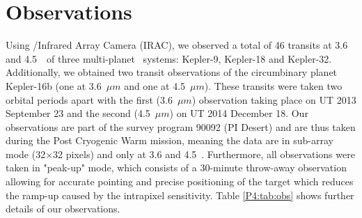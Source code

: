 \section{Observations}
\label{P4:sec:obs}

Using \spitzer/Infrared Array Camera (IRAC), we observed a total of 46 transits at 3.6 and 4.5~\um~of three multi-planet \Kepler~systems: Kepler-9, Kepler-18 and Kepler-32. Additionally, we obtained two transit observations of the circumbinary planet Kepler-16b (one at 3.6~$\mu m$ and one at 4.5~$\mu m$). These transits were taken two orbital periods apart with the first (3.6~$\mu m$) observation taking place on UT 2013 September 23 and the second (4.5~$\mu m$) on UT 2014 December 18. Our observations are part of the survey program 90092 (PI Desert) and are thus taken during the Post Cryogenic Warm \spitzerIRAC mission, meaning the data are in sub-array mode (32$\times$32 pixels) and only at 3.6 and 4.5~\um. Furthermore, all observations were taken in "peak-up" mode, which consists of a 30-minute throw-away observation allowing for accurate pointing and precise positioning of the target which reduces the ramp-up caused by the intrapixel sensitivity. Table \ref{P4:tab:obs} shows further details of our observations.


